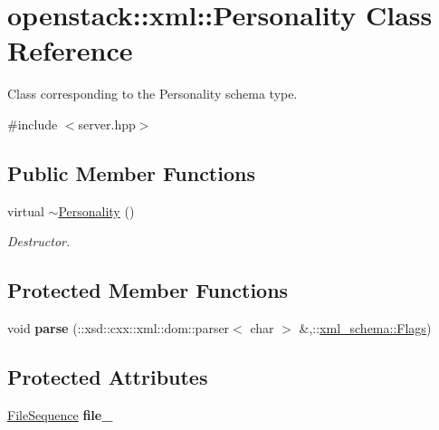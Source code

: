 \hypertarget{classopenstack_1_1xml_1_1Personality}{
\section{openstack::xml::Personality Class Reference}
\label{classopenstack_1_1xml_1_1Personality}
}


Class corresponding to the Personality schema type.  




{\ttfamily \#include $<$server.hpp$>$}

\subsection*{Public Member Functions}
\begin{DoxyCompactItemize}
\item 
\hypertarget{classopenstack_1_1xml_1_1Personality_a946bad1567eda11aeb8be5f2eb61f9e2}{
virtual \hyperlink{classopenstack_1_1xml_1_1Personality_a946bad1567eda11aeb8be5f2eb61f9e2}{$\sim$Personality} ()}
\label{classopenstack_1_1xml_1_1Personality_a946bad1567eda11aeb8be5f2eb61f9e2}

\begin{DoxyCompactList}\small\item\em Destructor. \item\end{DoxyCompactList}\end{DoxyCompactItemize}
\subsection*{Protected Member Functions}
\begin{DoxyCompactItemize}
\item 
\hypertarget{classopenstack_1_1xml_1_1Personality_aecfe78c6ff41a2b40531325b611abc6f}{
void {\bfseries parse} (::xsd::cxx::xml::dom::parser$<$ char $>$ \&,::\hyperlink{namespacexml__schema_affb4c227cbd9aa7453dd1dc5a1401943}{xml\_\-schema::Flags})}
\label{classopenstack_1_1xml_1_1Personality_aecfe78c6ff41a2b40531325b611abc6f}

\end{DoxyCompactItemize}
\subsection*{Protected Attributes}
\begin{DoxyCompactItemize}
\item 
\hypertarget{classopenstack_1_1xml_1_1Personality_a457d93fc7a44ff5ab74d090063f21a95}{
\hyperlink{classopenstack_1_1xml_1_1Personality_abbaf1d8ddffe77ba545048797e251b0b}{FileSequence} {\bfseries file\_\-}}
\label{classopenstack_1_1xml_1_1Personality_a457d93fc7a44ff5ab74d090063f21a95}

\end{DoxyCompactItemize}
